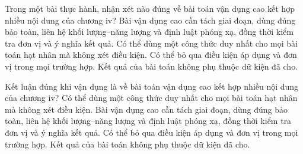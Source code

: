 \begin{ex}
Trong một bài thực hành, nhận xét nào đúng về bài toán vận dụng cao kết hợp nhiều nội dung của chương iv?
\choice
{\True Bài vận dụng cao cần tách giai đoạn, dùng đúng bảo toàn, liên hệ khối lượng–năng lượng và định luật phóng xạ, đồng thời kiểm tra đơn vị và ý nghĩa kết quả.}
{Có thể dùng một công thức duy nhất cho mọi bài toán hạt nhân mà không xét điều kiện.}
{Có thể bỏ qua điều kiện áp dụng và đơn vị trong mọi trường hợp.}
{Kết quả của bài toán không phụ thuộc dữ kiện đã cho.}
\end{ex}

\begin{ex}
Kết luận đúng khi vận dụng là về bài toán vận dụng cao kết hợp nhiều nội dung của chương iv?
\choice
{Có thể dùng một công thức duy nhất cho mọi bài toán hạt nhân mà không xét điều kiện.}
{\True Bài vận dụng cao cần tách giai đoạn, dùng đúng bảo toàn, liên hệ khối lượng–năng lượng và định luật phóng xạ, đồng thời kiểm tra đơn vị và ý nghĩa kết quả.}
{Có thể bỏ qua điều kiện áp dụng và đơn vị trong mọi trường hợp.}
{Kết quả của bài toán không phụ thuộc dữ kiện đã cho.}
\end{ex}

